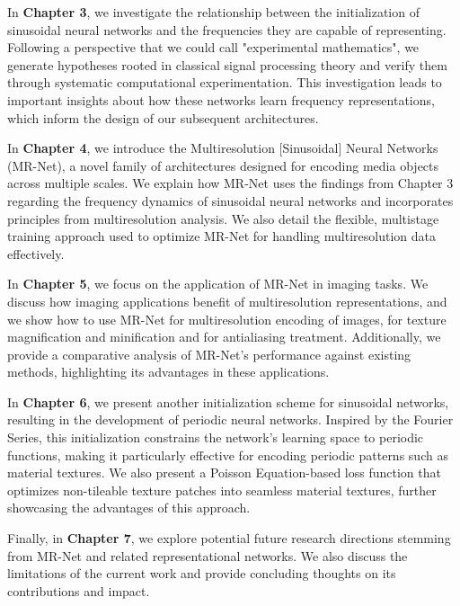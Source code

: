 In \textbf{Chapter 3}, we investigate the relationship between the initialization of sinusoidal neural networks and the frequencies they are capable of representing. Following a perspective that we could call "experimental mathematics", we generate hypotheses rooted in classical signal processing theory and verify them through systematic computational experimentation. This investigation leads to important insights about how these networks learn frequency representations, which inform the design of our subsequent architectures.

In \textbf{Chapter 4}, we introduce the Multiresolution [Sinusoidal] Neural Networks (MR-Net), a novel family of architectures designed for encoding media objects across multiple scales. We explain how MR-Net uses the findings from Chapter 3 regarding the frequency dynamics of sinusoidal neural networks and incorporates principles from multiresolution analysis. We also detail the flexible, multistage training approach used to optimize MR-Net for handling multiresolution data effectively.

In \textbf{Chapter 5}, we focus on the application of MR-Net in imaging tasks. We discuss how imaging applications benefit of multiresolution representations, and we show how to use MR-Net for multiresolution encoding of images, for texture magnification and minification and for antialiasing treatment. Additionally, we provide a comparative analysis of MR-Net's performance against existing methods, highlighting its advantages in these applications.

In \textbf{Chapter 6}, we present another initialization scheme for sinusoidal networks, resulting in the development of periodic neural networks. Inspired by the Fourier Series, this initialization constrains the network's learning space to periodic functions, making it particularly effective for encoding periodic patterns such as material textures. We also present a Poisson Equation-based loss function that optimizes non-tileable texture patches into seamless material textures, further showcasing the advantages of this approach.

Finally, in \textbf{Chapter 7}, we explore potential future research directions stemming from MR-Net and related representational networks. We also discuss the limitations of the current work and provide concluding thoughts on its contributions and impact.
